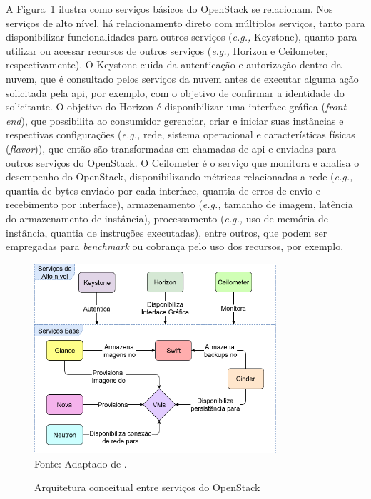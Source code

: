 A Figura~\ref{fig:openstack_service_architecture} ilustra como serviços básicos do OpenStack se relacionam.
%
Nos serviços de alto nível, há relacionamento direto com múltiplos serviços, tanto para disponibilizar funcionalidades para outros serviços (\textit{e.g.,} Keystone), quanto para utilizar ou acessar recursos de outros serviços (\textit{e.g.,} Horizon e Ceilometer, respectivamente).
%
O Keystone cuida da autenticação e autorização dentro da nuvem, que é consultado pelos serviços da nuvem antes de executar alguma ação solicitada pela \ac{api}, por exemplo, com o objetivo de confirmar a identidade do solicitante.
%
O objetivo do Horizon é disponibilizar uma interface gráfica (\textit{front-end}), que possibilita ao consumidor gerenciar, criar e iniciar suas instâncias e respectivas configurações (\textit{e.g.,} rede, sistema operacional e características físicas (\textit{flavor})), que então são transformadas em chamadas de \ac{api} e enviadas para outros serviços do OpenStack.
%
O Ceilometer é o serviço que monitora e analisa o desempenho do OpenStack, disponibilizando métricas relacionadas a rede (\textit{e.g.,} quantia de bytes enviado por cada interface, quantia de erros de envio e recebimento por interface),  armazenamento (\textit{e.g.,} tamanho de imagem, latência do armazenamento de instância), processamento (\textit{e.g.,} uso de memória de instância, quantia de instruções executadas), entre outros, que podem ser empregadas para \textit{benchmark} ou cobrança pelo uso dos recursos, por exemplo.

\begin{figure}[!htb]
	\centering
	\caption{Arquitetura conceitual entre serviços do OpenStack}
	\includegraphics[width=0.8\textwidth]{img/openstack_arquitetura_servicos.png}
	\label{fig:openstack_service_architecture}\\
	Fonte: Adaptado de \cite{openstack:newton}.
\end{figure}

